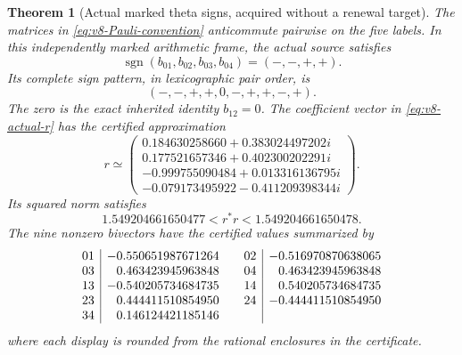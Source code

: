 \documentclass[11pt]{article}
\newtheorem{theorem}{Theorem}[section]
\theoremstyle{definition}
\theoremstyle{remark}
\begin{document}
\begin{theorem}[Actual marked theta signs, acquired without a renewal target]
\label{thm:v8-theta-signs}
The matrices in \eqref{eq:v8-Pauli-convention} anticommute pairwise on the
five labels. In this independently marked arithmetic frame, the actual
source satisfies
\begin{equation}
 \boxed{\operatorname{sgn}(b_{01},b_{02},b_{03},b_{04})=(-,-,+,+).}
 \label{eq:v8-four-signs}
\end{equation}
Its complete sign pattern, in lexicographic pair order, is
\begin{equation}
 \boxed{(-,-,+,+,0,-,+,+,-,+).}
 \label{eq:v8-all-signs}
\end{equation}
The zero is the exact inherited identity $b_{12}=0$. The coefficient vector
in \eqref{eq:v8-actual-r} has the certified approximation
\begin{equation}
 r\simeq\begin{pmatrix}
 0.184630258660+0.383024497202i\\
 0.177521657346+0.402300202291i\\
 -0.999755090484+0.013316136795i\\
 -0.079173495922-0.411209398344i
 \end{pmatrix}.
 \label{eq:v8-r-numeric}
\end{equation}
Its squared norm satisfies
\[1.549204661650477<r^*r<1.549204661650478.\]
The nine nonzero bivectors have the certified values summarized by
\[
 \begin{array}{c|r@{\qquad}c|r}
 01&-0.550651987671264&02&-0.516970870638065\\
 03& 0.463423945963848&04& 0.463423945963848\\
 13&-0.540205734684735&14& 0.540205734684735\\
 23& 0.444411510854950&24&-0.444411510854950\\
 34& 0.146124421185146&&
 \end{array}
\]
where each display is rounded from the rational enclosures in the certificate.
\end{theorem}
\end{document}
